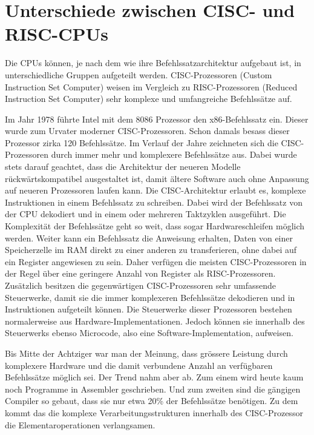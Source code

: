 \section{Unterschiede zwischen CISC- und RISC-CPUs\cite{todo}}

Die CPUs können, je nach dem wie ihre Befehlssatzarchitektur aufgebaut ist, in unterschiedliche Gruppen aufgeteilt werden. CISC-Prozessoren (Custom Instruction Set Computer) weisen im Vergleich zu RISC-Prozessoren (Reduced Instruction Set Computer) sehr komplexe und umfangreiche Befehlssätze auf.
\par
Im Jahr 1978 führte Intel mit dem 8086 Prozessor den x86-Befehlssatz ein. Dieser wurde zum Urvater moderner CISC-Prozessoren. Schon damals besass dieser Prozessor zirka 120 Befehlssätze. Im Verlauf der Jahre zeichneten sich die CISC-Prozessoren durch immer mehr und komplexere Befehlssätze aus. Dabei wurde stets darauf geachtet, dass die Architektur der neueren Modelle rückwärtskompatibel ausgestaltet ist, damit ältere Software auch ohne Anpassung auf neueren Prozessoren laufen kann. Die CISC-Architektur erlaubt es, komplexe Instruktionen in einem Befehlssatz zu schreiben. Dabei wird der Befehlssatz von der CPU dekodiert und in einem oder mehreren Taktzyklen ausgeführt. Die Komplexität der Befehlssätze geht so weit, dass sogar Hardwareschleifen möglich werden. Weiter kann ein Befehlssatz die Anweisung erhalten, Daten von einer Speicherzelle im RAM direkt zu einer anderen zu transferieren, ohne dabei auf ein Register angewiesen zu sein. Daher verfügen die meisten CISC-Prozessoren in der Regel über eine geringere Anzahl von Register als RISC-Prozessoren. Zusätzlich besitzen die gegenwärtigen CISC-Prozessoren sehr umfassende Steuerwerke, damit sie die immer komplexeren Befehlssätze dekodieren und in Instruktionen aufgeteilt können. Die Steuerwerke dieser Prozessoren bestehen normalerweise aus Hardware-Implementationen. Jedoch können sie innerhalb des Steuerwerks ebenso Microcode, also eine Software-Implementation, aufweisen.
\par
Bis Mitte der Achtziger war man der Meinung, dass grössere Leistung durch komplexere Hardware und die damit verbundene Anzahl an verfügbaren Befehlssätze möglich sei. Der Trend nahm aber ab. Zum einem wird heute kaum noch Programme in Assembler geschrieben. Und zum zweiten sind die gängigen Compiler so gebaut, dass sie nur etwa 20\% der Befehlssätze benötigen. Zu dem kommt das die komplexe Verarbeitungsstrukturen innerhalb des CISC-Prozessor die Elementaroperationen verlangsamen.
\par
